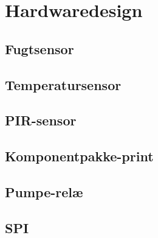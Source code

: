 \chapter{Hardwaredesign}

\section{Fugtsensor}


\section{Temperatursensor}


\section{PIR-sensor}


\section{Komponentpakke-print}


\section{Pumpe-relæ}


\section{SPI}

